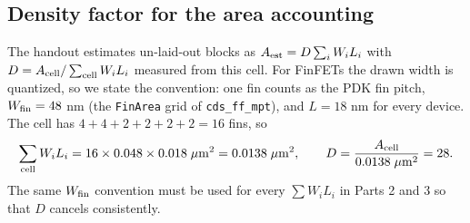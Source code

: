 \documentclass[10pt,letterpaper]{article}
\newcommand{\densityD}{28}          %
\begin{document}
\subsection{Density factor for the area accounting}
The handout estimates un-laid-out blocks as $A_{\rm est}=D\sum_i W_iL_i$ with $D=A_{\rm cell}/\sum_{\rm cell}W_iL_i$ measured from this cell. For FinFETs the drawn width is quantized, so we state the convention: one fin counts as the PDK fin pitch, $W_{\rm fin}=48$ nm (the \texttt{FinArea} grid of \texttt{cds\_ff\_mpt}), and $L=18$ nm for every device. The cell has $4+4+2+2+2+2=16$ fins, so
\begin{equation}
\sum_{\rm cell}W_iL_i=16\times0.048\times0.018\;\mu\mathrm m^2=0.0138\;\mu\mathrm m^2,
\qquad
D=\frac{A_{\rm cell}}{0.0138\;\mu\mathrm m^2}=\densityD .
\label{eq:density}
\end{equation}
The same $W_{\rm fin}$ convention must be used for every $\sum W_iL_i$ in Parts 2 and 3 so that $D$ cancels consistently.
\end{document}
